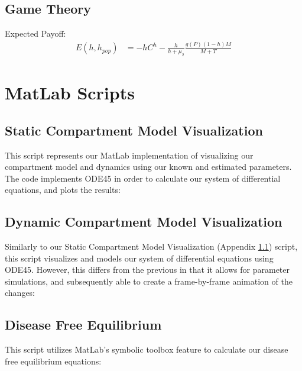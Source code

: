 \documentclass[12pt]{article}
\begin{document}
    \subsection{Game Theory}
    Expected Payoff: 
    \begin{align*}
        E (h, h_{pop}) &= -hC^{h} - \frac{h}{h+\mu_{2}} \frac{g(P)(1-h)M}{M+T}
    \end{align*}
    
    \section{MatLab Scripts}
        \subsection{Static Compartment Model Visualization}
        \label{appendix:B1}
        This script represents our MatLab implementation of visualizing our compartment model and dynamics using our known and estimated parameters. The code implements ODE45 in order to calculate our system of differential equations, and plots the results:
        \begin{center}
            
        \end{center}
        
        \subsection{Dynamic Compartment Model Visualization}
        \label{appendix:B2}
        Similarly to our Static Compartment Model Visualization (Appendix \ref{appendix:B1}) script, this script visualizes and models our system of differential equations using ODE45. However, this differs from the previous in that it allows for parameter simulations, and subsequently able to create a frame-by-frame animation of the changes:
        \begin{center}
            
        \end{center}
        
        \subsection{Disease Free Equilibrium}
        \label{appendix:B3}
        This script utilizes MatLab's symbolic toolbox feature to calculate our disease free equilibrium equations:
        \begin{center}
            
        \end{center}
        
\end{document}
